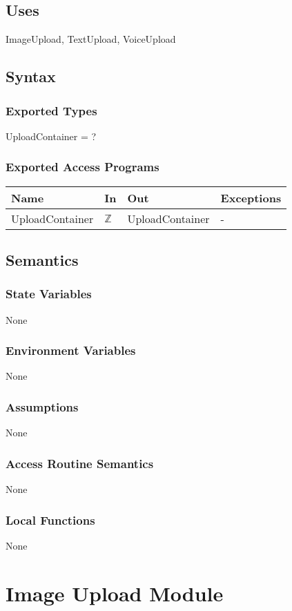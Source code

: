 \documentclass[12pt, titlepage]{article}
\begin{document}
\subsection{Uses}
ImageUpload, TextUpload, VoiceUpload
\subsection{Syntax}
\subsubsection{Exported Types}
UploadContainer = ?
\subsubsection{Exported Access Programs}
\begin{center}
	\begin{tabular}{p{3cm} p{5cm} p{5cm} p{2cm}}
		\hline
		\textbf{Name} & \textbf{In} & \textbf{Out} & \textbf{Exceptions} \\
		\hline
		UploadContainer & $\mathbb{Z}$ & UploadContainer & - \\
		\hline
	\end{tabular}
\end{center}
\subsection{Semantics}
\subsubsection{State Variables}
None
\subsubsection{Environment Variables}
None
\subsubsection{Assumptions}
None
\subsubsection{Access Routine Semantics}
None
\subsubsection{Local Functions}
None

\newpage

\section{Image Upload Module} \label{ImageUpload} 
\end{document}
